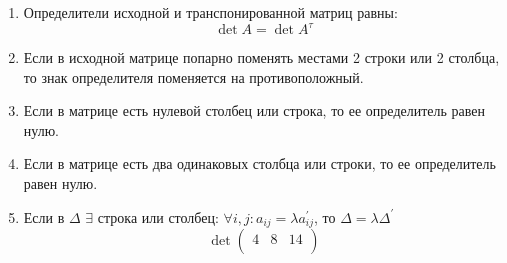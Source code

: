 \documentclass[class=article,a4paper,12pt,crop=false]{standalone}
\begin{document}
\begin{enumerate}
  \item {
    Определители исходной и транспонированной матриц равны: 
    \begin{equation}
      \det{A}=\det{A^\tau}
    \end{equation}
  }
  \item {
    Если в исходной матрице попарно поменять местами 2 строки или 2
    столбца, то знак определителя поменяется на противоположный.
  }
  \item {
    Если в матрице есть нулевой столбец или строка, то ее определитель равен нулю.
  }
  \item {
    Если в матрице есть два одинаковых столбца или строки, то ее определитель равен нулю.
  }
  \item {
    Если в $\Delta$ $\exists$ строка или столбец: $\forall i,j : a_{ij} = \lambda a^{'}_{ij}$, то $\Delta = \lambda \Delta^{'}$
    \begin{equation}
      \det{
        \begin{pmatrix}
          4 & 8 & 14 \\

\end{pmatrix}}
\end{equation}}
\end{enumerate}
\end{document}
